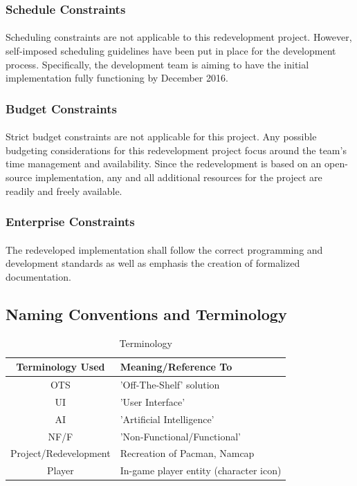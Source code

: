 \documentclass[12pt, titlepage]{article}
\begin{document}
\subsubsection{Schedule Constraints}
\paragraph{}
Scheduling constraints are not applicable to this redevelopment project. However, self-imposed scheduling guidelines have been put in place for the development process. Specifically, the development team is aiming to have the initial implementation fully functioning by December 2016.

\subsubsection{Budget Constraints}
\paragraph{}
Strict budget constraints are not applicable for this project. Any possible budgeting considerations for this redevelopment project focus around the team's time management and availability. Since the redevelopment is based on an open-source implementation, any and all additional resources for the project are readily and freely available.

\subsubsection{Enterprise Constraints}
\paragraph{}
The redeveloped implementation shall follow the correct programming and development standards as well as emphasis the creation of formalized documentation.

\subsection{Naming Conventions and Terminology}
\begin{table}[H]
\caption{Terminology} \label{tab:terms}
\begin{center}
\begin{tabular}{| c | l |}
\hline
\textbf{Terminology Used} & \textbf{Meaning/Reference To} \\ \hline
OTS & 'Off-The-Shelf' solution \\ \hline
UI & 'User Interface' \\ \hline
AI & 'Artificial Intelligence' \\ \hline
NF/F & 'Non-Functional/Functional' \\ \hline
Project/Redevelopment & Recreation of Pacman, Namcap \\ \hline
Player & In-game player entity (character icon)\\
\hline
\end{tabular}
\end{center}
\end{table}
\end{document}
